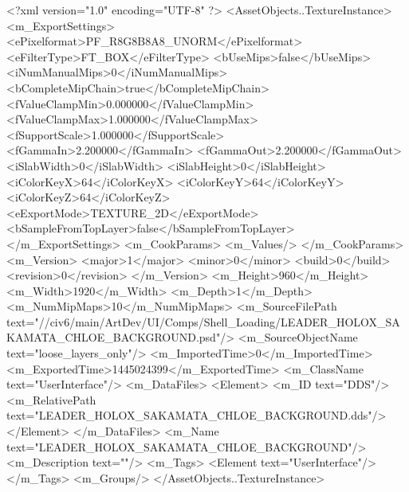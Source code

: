 <?xml version="1.0" encoding="UTF-8" ?>
<AssetObjects..TextureInstance>
	<m_ExportSettings>
		<ePixelformat>PF_R8G8B8A8_UNORM</ePixelformat>
		<eFilterType>FT_BOX</eFilterType>
		<bUseMips>false</bUseMips>
		<iNumManualMips>0</iNumManualMips>
		<bCompleteMipChain>true</bCompleteMipChain>
		<fValueClampMin>0.000000</fValueClampMin>
		<fValueClampMax>1.000000</fValueClampMax>
		<fSupportScale>1.000000</fSupportScale>
		<fGammaIn>2.200000</fGammaIn>
		<fGammaOut>2.200000</fGammaOut>
		<iSlabWidth>0</iSlabWidth>
		<iSlabHeight>0</iSlabHeight>
		<iColorKeyX>64</iColorKeyX>
		<iColorKeyY>64</iColorKeyY>
		<iColorKeyZ>64</iColorKeyZ>
		<eExportMode>TEXTURE_2D</eExportMode>
		<bSampleFromTopLayer>false</bSampleFromTopLayer>
	</m_ExportSettings>
	<m_CookParams>
		<m_Values/>
	</m_CookParams>
	<m_Version>
		<major>1</major>
		<minor>0</minor>
		<build>0</build>
		<revision>0</revision>
	</m_Version>
	<m_Height>960</m_Height>
	<m_Width>1920</m_Width>
	<m_Depth>1</m_Depth>
	<m_NumMipMaps>10</m_NumMipMaps>
	<m_SourceFilePath text="//civ6/main/ArtDev/UI/Comps/Shell_Loading/LEADER_HOLOX_SAKAMATA_CHLOE_BACKGROUND.psd"/>
	<m_SourceObjectName text="loose_layers_only"/>
	<m_ImportedTime>0</m_ImportedTime>
	<m_ExportedTime>1445024399</m_ExportedTime>
	<m_ClassName text="UserInterface"/>
	<m_DataFiles>
		<Element>
			<m_ID text="DDS"/>
			<m_RelativePath text="LEADER_HOLOX_SAKAMATA_CHLOE_BACKGROUND.dds"/>
		</Element>
	</m_DataFiles>
	<m_Name text="LEADER_HOLOX_SAKAMATA_CHLOE_BACKGROUND"/>
	<m_Description text=""/>
	<m_Tags>
		<Element text="UserInterface"/>
	</m_Tags>
	<m_Groups/>
</AssetObjects..TextureInstance>

